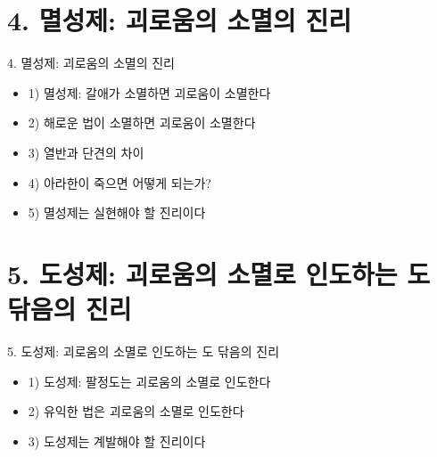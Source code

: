 \documentclass[aspectratio=1610,14pt,xcolor=pdftex,dvipsnames,table,handout]{beamer}
\begin{document}
		\section{4. 멸성제: 괴로움의 소멸의 진리}
		\frame [plain] {\sectionpage}

		\begin{frame} [t,plain]
			\begin{block} {4. 멸성제: 괴로움의 소멸의 진리}
			\begin{itemize}
				\item 1) 멸성제: 갈애가 소멸하면 괴로움이 소멸한다
				\item 2) 해로운 법이 소멸하면 괴로움이 소멸한다
				\item 3) 열반과 단견의 차이
				\item 4) 아라한이 죽으면 어떻게 되는가?
				\item 5) 멸성제는 실현해야 할 진리이다
			\end{itemize}
			\end{block}
		\end{frame}

		\section{5. 도성제: 괴로움의 소멸로 인도하는 도 닦음의 진리}
		\frame [plain] {\sectionpage}

		\begin{frame} [t,plain]
			\begin{block} {5. 도성제: 괴로움의 소멸로 인도하는 도 닦음의 진리}
			\begin{itemize}
				\item 1) 도성제: 팔정도는 괴로움의 소멸로 인도한다
				\item 2) 유익한 법은 괴로움의 소멸로 인도한다
				\item 3) 도성제는 계발해야 할 진리이다
			\end{itemize}
			\end{block}
		\end{frame}

\end{document}
